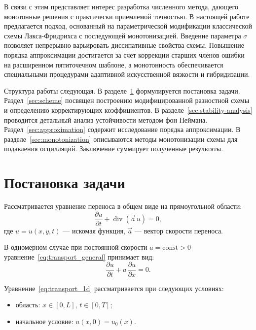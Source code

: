 \documentclass[12pt]{article}
\begin{document}
В связи с этим представляет интерес разработка численного метода, дающего монотонные решения с практически приемлемой точностью. В настоящей работе предлагается подход, основанный на параметрической модификации классической схемы Лакса-Фридрихса с последующей монотонизацией. Введение параметра $\sigma$ позволяет непрерывно варьировать диссипативные свойства схемы. Повышение порядка аппроксимации достигается за счет коррекции старших членов ошибки на расширенном пятиточечном шаблоне, а монотонность обеспечивается специальными процедурами адаптивной искусственной вязкости и гибридизации.

Структура работы следующая. В разделе~\ref{sec:problem} формулируется постановка задачи. Раздел~\ref{sec:scheme} посвящен построению модифицированной разностной схемы и определению корректирующих коэффициентов. В разделе~\ref{sec:stability-analysis} проводится детальный анализ устойчивости методом фон Неймана. Раздел~\ref{sec:approximation} содержит исследование порядка аппроксимации. В разделе~\ref{sec:monotonization} описываются методы монотонизации схемы для подавления осцилляций. Заключение суммирует полученные результаты.

\section{Постановка задачи}
\label{sec:problem}

Рассматривается уравнение переноса в общем виде на прямоугольной области:
\begin{equation}
\frac{\partial u}{\partial t} + \operatorname{div}(\vec{a}\,u) = 0,
\label{eq:transport_general}
\end{equation}
где $u = u(x,y,t)$ --- искомая функция, $\vec{a}$ --- вектор скорости переноса.

В одномерном случае при постоянной скорости $a = \mathrm{const} > 0$ уравнение~\eqref{eq:transport_general} принимает вид:
\begin{equation}
\frac{\partial u}{\partial t} + a\,\frac{\partial u}{\partial x} = 0.
\label{eq:transport_1d}
\end{equation}

Уравнение~\eqref{eq:transport_1d} рассматривается при следующих условиях:
\begin{itemize}
\item область: $x \in [0, L]$, $t \in [0, T]$;
\item начальное условие: $u(x, 0) = u_0(x)$.
\end{itemize}
\end{document}
